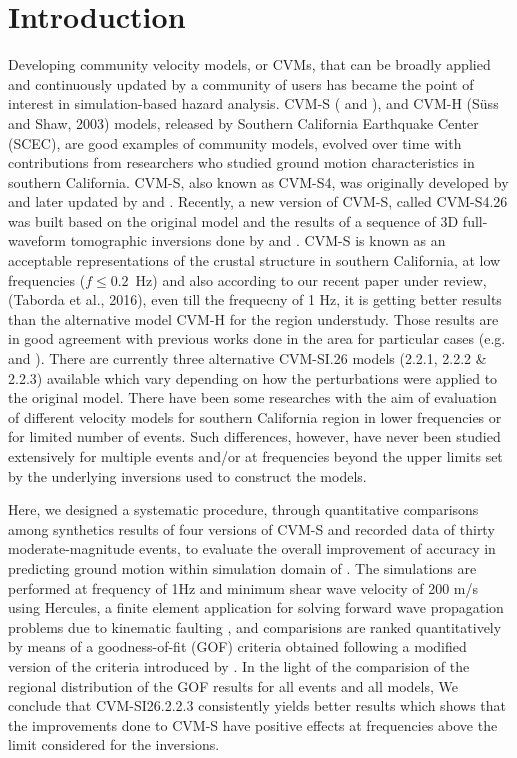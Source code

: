 \section{Introduction}

Developing community velocity models, or CVMs, that can be broadly applied and continuously updated by a community of users has became the point of interest in simulation-based hazard analysis. CVM-S (\citet{Magistrale_2000_BSSA} and \citet{Kohler_2003_BSSA}), and CVM-H (Süss and Shaw, 2003) models, released by Southern California Earthquake Center (SCEC), are good examples of community models, evolved over time with contributions from researchers who studied ground motion characteristics in southern California. CVM-S, also known as CVM-S4, was originally developed by \citet{Magistrale_1996_BSSA} and later updated by \citet{Magistrale_2000_BSSA} and \citet{Kohler_2003_BSSA}. Recently, a new version of CVM-S, called CVM-S4.26 was built based on the original model and the results of a sequence of 3D full-waveform tomographic inversions done by \citet{Chen_2007_BSSA} and \citet{Lee_2014_JGR}. CVM-S is known as an acceptable representations of the crustal structure in southern California, at low frequencies ($f \leq 0.2$~Hz) and also according to our recent paper under review, (Taborda et al., 2016), even till the frequecny of 1 Hz, it is getting better results than the alternative model CVM-H for the region understudy. Those results are in good agreement with previous works done in the area for particular cases (e.g. \citet{Taborda_2014_BSSA}and \citet{Lee_2014_SRL}). There are currently three alternative CVM-SI.26 models (2.2.1, 2.2.2 \& 2.2.3) available which vary depending on how the perturbations were applied to the original model. There have been some researches with the aim of evaluation of different velocity models for southern California region in lower frequencies or for limited number of events. Such differences, however, have never been studied extensively for multiple events and/or at frequencies beyond the upper limits set by the underlying inversions used to construct the models.\par

Here, we designed a systematic procedure, through quantitative comparisons among synthetics results of four versions of CVM-S and recorded data of thirty moderate-magnitude events, to evaluate the overall improvement of accuracy in predicting ground motion within simulation domain of . The simulations are performed at frequency of 1Hz and minimum shear wave velocity of 200 m/s using Hercules, a finite element application for solving forward wave propagation problems due to kinematic faulting \citep{Tu_2006_Proc, Taborda_2010_Tech}, and comparisions are ranked quantitatively by means of a goodness-of-fit (GOF) criteria obtained following a modified version of the criteria introduced by \citet{Anderson_2004_Proc}. In the light of the comparision of the regional distribution of the GOF results for all events and all models, We conclude that CVM-SI26.2.2.3 consistently yields better results which shows that the improvements done to CVM-S have positive effects at frequencies above the limit considered for the inversions. 
